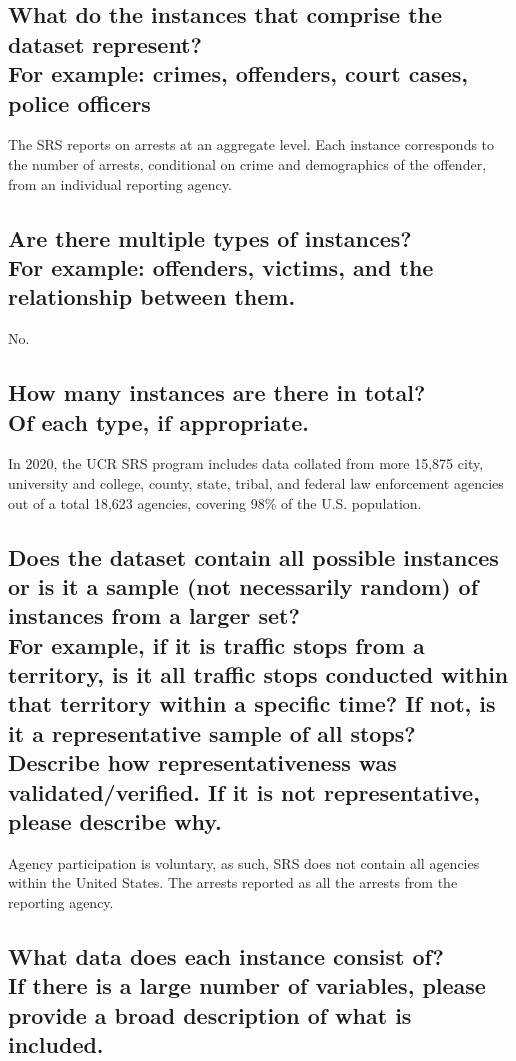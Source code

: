 \documentclass[letterpaper, 10 pt, conference]{ieeeconf}  %
\newcommand{\subtitle}[1]{{\\ \small \normalfont \color{purple} #1}}
\begin{document}
\subsection{What do the instances that comprise the dataset represent? \subtitle{For example: crimes, offenders, court cases, police officers}}

The SRS reports on arrests at an aggregate level. Each instance corresponds to the number of arrests, conditional on crime and demographics of the offender, from an individual reporting agency.

\subsection{Are there multiple types of instances? \subtitle{For example: offenders, victims, and the relationship between them.}}

No.

\subsection{How many instances are there in total? \subtitle{Of each type, if appropriate.}}

In 2020, the UCR SRS program includes data collated from more 15,875 city, university and college, county, state, tribal, and federal law enforcement agencies out of a total 18,623 agencies, covering 98\% of the U.S. population.

\subsection{Does the dataset contain all possible instances or is it a sample (not necessarily random) of instances from a larger set? \subtitle{For example, if it is traffic stops from a territory, is it all traffic stops conducted within that territory within a specific time? If not, is it a representative sample of all stops? Describe how representativeness was validated/verified. If it is not representative, please describe why.}}

Agency participation is voluntary, as such, SRS does not contain all agencies within the United States. The arrests reported as all the arrests from the reporting agency. 

\subsection{What data does each instance consist of? \subtitle{If there is a large number of variables, please provide a broad description of what is included.}}
\end{document}
